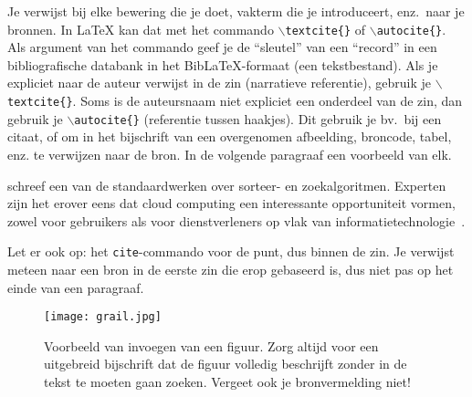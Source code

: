 Je verwijst bij elke bewering die je doet, vakterm die je introduceert, enz.\ naar je bronnen. In \LaTeX{} kan dat met het commando \texttt{$\backslash${textcite\{\}}} of \texttt{$\backslash${autocite\{\}}}. Als argument van het commando geef je de ``sleutel'' van een ``record'' in een bibliografische databank in het Bib\LaTeX{}-formaat (een tekstbestand). Als je expliciet naar de auteur verwijst in de zin (narratieve referentie), gebruik je \texttt{$\backslash${}textcite\{\}}. Soms is de auteursnaam niet expliciet een onderdeel van de zin, dan gebruik je \texttt{$\backslash${}autocite\{\}} (referentie tussen haakjes). Dit gebruik je bv.~bij een citaat, of om in het bijschrift van een overgenomen afbeelding, broncode, tabel, enz. te verwijzen naar de bron. In de volgende paragraaf een voorbeeld van elk.

\textcite{Knuth1998} schreef een van de standaardwerken over sorteer- en zoekalgoritmen. Experten zijn het erover eens dat cloud computing een interessante opportuniteit vormen, zowel voor gebruikers als voor dienstverleners op vlak van informatietechnologie~\autocite{Creeger2009}.

Let er ook op: het \texttt{cite}-commando voor de punt, dus binnen de zin. Je verwijst meteen naar een bron in de eerste zin die erop gebaseerd is, dus niet pas op het einde van een paragraaf.

\begin{figure}
    \centering
    \texttt{[image: grail.jpg]}
    \caption[Voorbeeld figuur.]{\label{fig:grail}Voorbeeld van invoegen van een figuur. Zorg altijd voor een uitgebreid bijschrift dat de figuur volledig beschrijft zonder in de tekst te moeten gaan zoeken. Vergeet ook je bronvermelding niet!}
\end{figure}